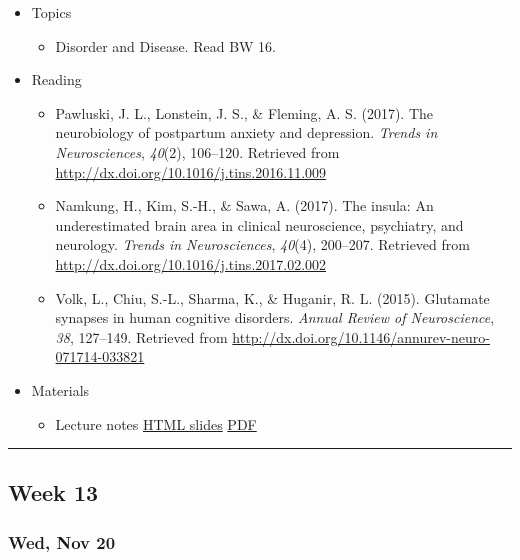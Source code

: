 \documentclass[]{article}
\providecommand{\tightlist}{%
  \setlength{\itemsep}{0pt}\setlength{\parskip}{0pt}}
\begin{document}
\begin{itemize}
\tightlist
\item
  Topics

  \begin{itemize}
  \tightlist
  \item
    Disorder and Disease. Read BW 16.
  \end{itemize}
\item
  Reading

  \begin{itemize}
  \tightlist
  \item
    Pawluski, J. L., Lonstein, J. S., \& Fleming, A. S. (2017). The
    neurobiology of postpartum anxiety and depression. \emph{Trends in
    Neurosciences}, \emph{40}(2), 106--120. Retrieved from
    \url{http://dx.doi.org/10.1016/j.tins.2016.11.009}
  \item
    Namkung, H., Kim, S.-H., \& Sawa, A. (2017). The insula: An
    underestimated brain area in clinical neuroscience, psychiatry, and
    neurology. \emph{Trends in Neurosciences}, \emph{40}(4), 200--207.
    Retrieved from \url{http://dx.doi.org/10.1016/j.tins.2017.02.002}
  \item
    Volk, L., Chiu, S.-L., Sharma, K., \& Huganir, R. L. (2015).
    Glutamate synapses in human cognitive disorders. \emph{Annual Review
    of Neuroscience}, \emph{38}, 127--149. Retrieved from
    \url{http://dx.doi.org/10.1146/annurev-neuro-071714-033821}
  \end{itemize}
\item
  Materials

  \begin{itemize}
  \tightlist
  \item
    Lecture notes \textbar{} \href{}{HTML slides} \textbar{}
    \href{}{PDF}
  \end{itemize}
\end{itemize}

\begin{center}\rule{0.5\linewidth}{\linethickness}\end{center}

\hypertarget{week-13}{%
\subsection{Week 13}\label{week-13}}

\hypertarget{wed-nov-20}{%
\subsubsection{Wed, Nov 20}\label{wed-nov-20}}
\end{document}
